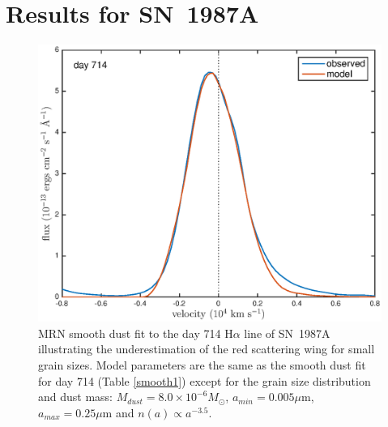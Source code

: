 \documentclass[useAMS,usenatbib,usegraphicx]{mnras}
\begin{document}
\section{Results for SN~1987A}
\label{results}

\begin{figure}
\begin{center}
\includegraphics[trim =33 10 45 15,clip=true,scale=0.51]{smooth/d714Ha_smooth_amC_MRN}
\caption{MRN smooth dust fit to the day 714 H$\alpha$ line of SN~1987A illustrating the 
underestimation of the red scattering wing for small grain sizes.  Model 
parameters are the same as the smooth dust fit for day 714 (Table \ref{smooth1}) except for the 
grain size distribution and dust mass:  $M_{dust}=8.0 \times 10^{-6} 
M_{\odot}$, $a_{min}=0.005 \mu$m, $a_{max}=0.25 \mu$m and $n(a) \propto 
a^{-3.5}$.}
\label{MRN}
\end{center}
\end{figure}
\end{document}
